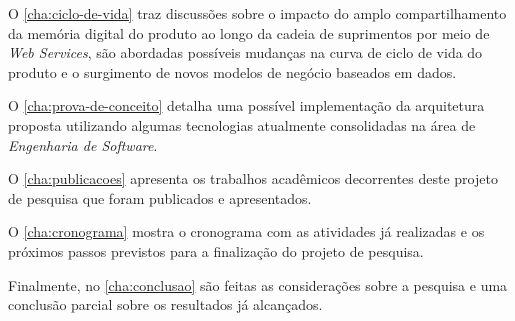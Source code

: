 	O \autoref{cha:ciclo-de-vida} traz discussões sobre o impacto do amplo compartilhamento da memória digital do produto ao longo da cadeia de suprimentos por meio de \textit{Web Services}, são abordadas possíveis mudanças na curva de ciclo de vida do produto e o surgimento de novos modelos de negócio baseados em dados.
	
	O \autoref{cha:prova-de-conceito} detalha uma possível implementação da arquitetura proposta utilizando algumas tecnologias atualmente consolidadas na área de \textit{Engenharia de Software}.
	
	O \autoref{cha:publicacoes} apresenta os trabalhos acadêmicos decorrentes deste projeto de pesquisa que foram publicados e apresentados.
	
	O \autoref{cha:cronograma} mostra o cronograma com as atividades já realizadas e os próximos passos previstos para a finalização do projeto de pesquisa.
	
	Finalmente, no \autoref{cha:conclusao} são feitas as considerações sobre a pesquisa e uma conclusão parcial sobre os resultados já alcançados.
	
	